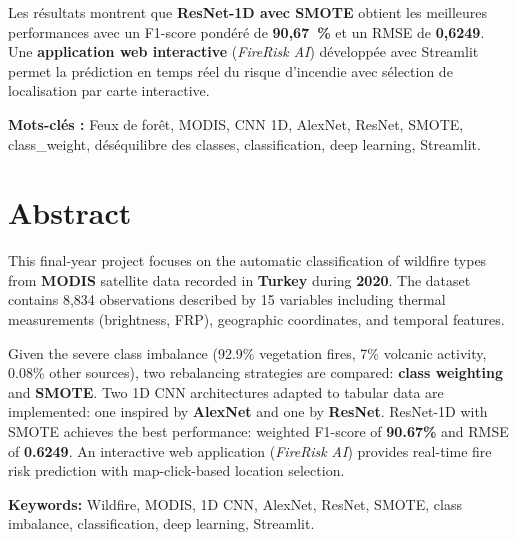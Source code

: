 \documentclass[12pt,a4paper]{report}
\begin{document}
Les r\'{e}sultats montrent que \textbf{ResNet-1D avec SMOTE} obtient les meilleures performances avec un F1-score pond\'{e}r\'{e} de \textbf{90,67~\%} et un RMSE de \textbf{0,6249}. Une \textbf{application web interactive} (\textit{FireRisk AI}) d\'{e}velopp\'{e}e avec Streamlit permet la pr\'{e}diction en temps r\'{e}el du risque d'incendie avec s\'{e}lection de localisation par carte interactive.

\vspace{0.5cm}
\noindent\textbf{Mots-cl\'{e}s :} Feux de for\^{e}t, MODIS, CNN 1D, AlexNet, ResNet, SMOTE, class\_weight, d\'{e}s\'{e}quilibre des classes, classification, deep learning, Streamlit.

\chapter*{Abstract}

\justifying
This final-year project focuses on the automatic classification of wildfire types from \textbf{MODIS} satellite data recorded in \textbf{Turkey} during \textbf{2020}. The dataset contains 8,834 observations described by 15 variables including thermal measurements (brightness, FRP), geographic coordinates, and temporal features.

Given the severe class imbalance (92.9\% vegetation fires, 7\% volcanic activity, 0.08\% other sources), two rebalancing strategies are compared: \textbf{class weighting} and \textbf{SMOTE}. Two 1D CNN architectures adapted to tabular data are implemented: one inspired by \textbf{AlexNet} and one by \textbf{ResNet}. ResNet-1D with SMOTE achieves the best performance: weighted F1-score of \textbf{90.67\%} and RMSE of \textbf{0.6249}. An interactive web application (\textit{FireRisk AI}) provides real-time fire risk prediction with map-click-based location selection.

\vspace{0.5cm}
\noindent\textbf{Keywords:} Wildfire, MODIS, 1D CNN, AlexNet, ResNet, SMOTE, class imbalance, classification, deep learning, Streamlit.

\listoffigures
{}

\listoftables
{}

\tableofcontents

\end{document}
